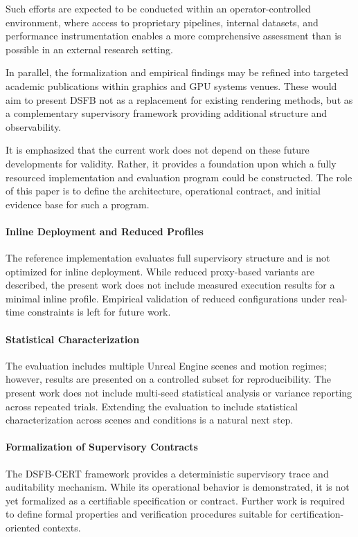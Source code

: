 \documentclass[11pt,letterpaper]{article}
\theoremstyle{gcresult}
\theoremstyle{definition}
\begin{document}
Such efforts are expected to be conducted within an operator-controlled environment, where access to proprietary pipelines, internal datasets, and performance instrumentation enables a more comprehensive assessment than is possible in an external research setting.

In parallel, the formalization and empirical findings may be refined into targeted academic publications within graphics and GPU systems venues. These would aim to present DSFB not as a replacement for existing rendering methods, but as a complementary supervisory framework providing additional structure and observability.

It is emphasized that the current work does not depend on these future developments for validity. Rather, it provides a foundation upon which a fully resourced implementation and evaluation program could be constructed. The role of this paper is to define the architecture, operational contract, and initial evidence base for such a program.


\paragraph{Inline Deployment and Reduced Profiles}
The reference implementation evaluates full supervisory structure and is not optimized for inline deployment. While reduced proxy-based variants are described, the present work does not include measured execution results for a minimal inline profile. Empirical validation of reduced configurations under real-time constraints is left for future work.

\paragraph{Statistical Characterization}
The evaluation includes multiple Unreal Engine scenes and motion regimes; however, results are presented on a controlled subset for reproducibility. The present work does not include multi-seed statistical analysis or variance reporting across repeated trials. Extending the evaluation to include statistical characterization across scenes and conditions is a natural next step.

\paragraph{Formalization of Supervisory Contracts}
The DSFB-CERT framework provides a deterministic supervisory trace and auditability mechanism. While its operational behavior is demonstrated, it is not yet formalized as a certifiable specification or contract. Further work is required to define formal properties and verification procedures suitable for certification-oriented contexts.
\end{document}
